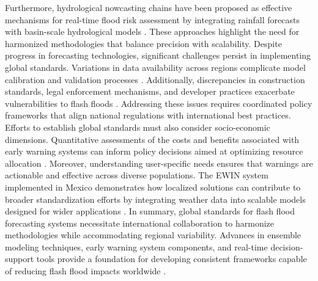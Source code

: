 Furthermore, hydrological nowcasting chains have been proposed as effective mechanisms for real-time flood risk assessment by integrating rainfall forecasts with basin-scale hydrological models \citep{Silvestro2017}. These approaches highlight the need for harmonized methodologies that balance precision with scalability. Despite progress in forecasting technologies, significant challenges persist in implementing global standards. Variations in data availability across regions complicate model calibration and validation processes \citep{Hinge2024}. Additionally, discrepancies in construction standards, legal enforcement mechanisms, and developer practices exacerbate vulnerabilities to flash floods \citep{Saad2024}. Addressing these issues requires coordinated policy frameworks that align national regulations with international best practices. Efforts to establish global standards must also consider socio-economic dimensions. Quantitative assessments of the costs and benefits associated with early warning systems can inform policy decisions aimed at optimizing resource allocation \citep{Jubach2016}. Moreover, understanding user-specific needs ensures that warnings are actionable and effective across diverse populations. The EWIN system implemented in Mexico demonstrates how localized solutions can contribute to broader standardization efforts by integrating weather data into scalable models designed for wider applications \citep{Msigwa2024}. In summary, global standards for flash flood forecasting systems necessitate international collaboration to harmonize methodologies while accommodating regional variability. Advances in ensemble modeling techniques, early warning system components, and real-time decision-support tools provide a foundation for developing consistent frameworks capable of reducing flash flood impacts worldwide \citep{Flamig2020}\citep{Jubach2016}\citep{Silvestro2017}\citep{Luong2021}.
